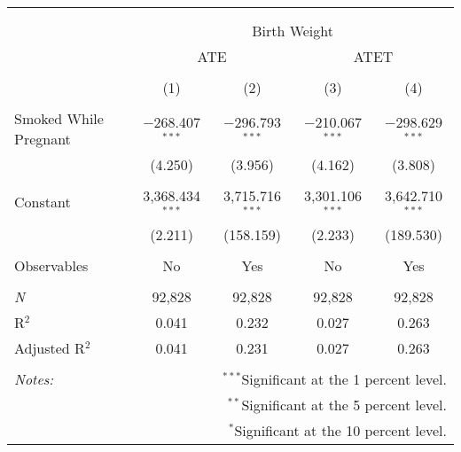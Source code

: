 
\begin{table}[!htbp] \centering 
  \caption{} 
  \label{} 
\begin{tabular}{@{\extracolsep{5pt}}lcccc} 
\\[-1.8ex]\hline 
\hline \\[-1.8ex] 
\\[-1.8ex] & \multicolumn{4}{c}{Birth Weight} \\ 
 & \multicolumn{2}{c}{ATE} & \multicolumn{2}{c}{ATET} \\ 
\\[-1.8ex] & (1) & (2) & (3) & (4)\\ 
\hline \\[-1.8ex] 
 Smoked While Pregnant & $-$268.407$^{***}$ & $-$296.793$^{***}$ & $-$210.067$^{***}$ & $-$298.629$^{***}$ \\ 
  & (4.250) & (3.956) & (4.162) & (3.808) \\ 
  & & & & \\ 
 Constant & 3,368.434$^{***}$ & 3,715.716$^{***}$ & 3,301.106$^{***}$ & 3,642.710$^{***}$ \\ 
  & (2.211) & (158.159) & (2.233) & (189.530) \\ 
  & & & & \\ 
Observables & No & Yes & No & Yes \\ 
 &  &  &  &  \\ 
\textit{N} & 92,828 & 92,828 & 92,828 & 92,828 \\ 
R$^{2}$ & 0.041 & 0.232 & 0.027 & 0.263 \\ 
Adjusted R$^{2}$ & 0.041 & 0.231 & 0.027 & 0.263 \\ 
\hline 
\hline \\[-1.8ex] 
\textit{Notes:} & \multicolumn{4}{r}{$^{***}$Significant at the 1 percent level.} \\ 
 & \multicolumn{4}{r}{$^{**}$Significant at the 5 percent level.} \\ 
 & \multicolumn{4}{r}{$^{*}$Significant at the 10 percent level.} \\ 
\end{tabular} 
\end{table} 

